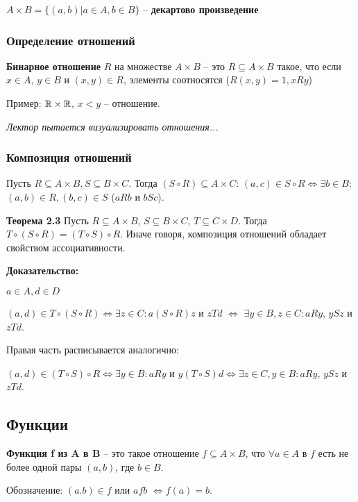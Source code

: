\documentclass[openany]{article}
\begin{document}
   $A \times B = \{(a, b) | a \in A, b \in B\}$ -- \textbf{декартово произведение}

   \subsubsection{Определение отношений}

   \textbf{Бинарное отношение} $R$ на множестве $A \times B$ -- это $R \subseteq A \times B$ такое, что если $x \in A$, $y \in B$ и $(x, y) \in R$, элементы соотносятся ($R(x, y) = 1, xRy$)

   Пример: $\mathbb{R} \times \mathbb{R}$, $x < y$ -- отношение.

   \textit{Лектор пытается визуализировать отношения...}

   \subsubsection{Композиция отношений}

   Пусть $R \subseteq A \times B, S \subseteq B \times C$. Тогда $(S \circ R) \subseteq A \times C$: $(a, c) \in S \circ R \Leftrightarrow \exists b \in B:$ $(a, b) \in R, (b, c) \in S$ ($aRb$ и $bSc$).

   \textbf{Теорема 2.3} Пусть $R \subseteq A \times B$, $S \subseteq B \times C$, $T \subseteq C \times D$. Тогда $T \circ (S \circ R) = (T \circ S) \circ R$. Иначе говоря, композиция отношений обладает свойством ассоциативности.

   \textbf{Доказательство:}

   $a \in A, d \in D$

   $(a, d) \in T \circ (S \circ R) \Leftrightarrow \exists z \in C: a(S \circ R)z$ и $zTd$ $\Leftrightarrow$ $\exists y \in B, z \in C: aRy$, $ySz$ и $zTd$.

   Правая часть расписывается аналогично:

   $(a, d) \in (T \circ S) \circ R \Leftrightarrow \exists y \in B: aRy$ и $y(T \circ S)d \Leftrightarrow \exists z \in C, y \in B: aRy$, $ySz$ и $zTd$.

   \subsection{Функции}

   \textbf{Функция f из A в B} -- это такое отношение $f \subseteq A \times B$, что $\forall a \in A$ в $f$ есть не более одной пары $(a, b)$, где $b \in B$.

   Обозначение: $(a. b) \in f$ или $afb$ $\Leftrightarrow f(a) = b$.
\end{document}

